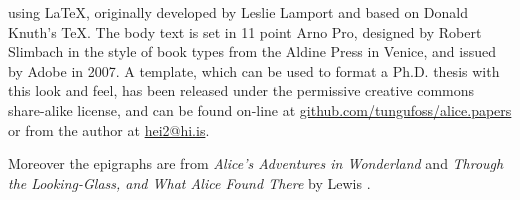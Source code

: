  using \LaTeX, originally developed by 
Leslie Lamport and based on Donald Knuth's \TeX. The body text is set in 11 
point Arno Pro, designed by Robert Slimbach in the style of book types from the 
Aldine Press in Venice, and issued by Adobe in 2007. A template, which can be 
used to format a Ph.D. thesis with this look and feel, has been released under 
the permissive creative commons share-alike license, and can be found on-line at
 \href{https://github.com/tungufoss/alice.papers/Thesis}{github.com/tungufoss/alice.papers}
or from the author at \href{mailto:hei2@hi.is}{hei2@hi.is}. 

Moreover the epigraphs are from \emph{Alice's Adventures in Wonderland} 
\citeyearpar{alice} and \emph{Through the Looking-Glass, and What Alice Found 
There} \citeyearpar{lookingglass} by Lewis \citeauthor{alice}.